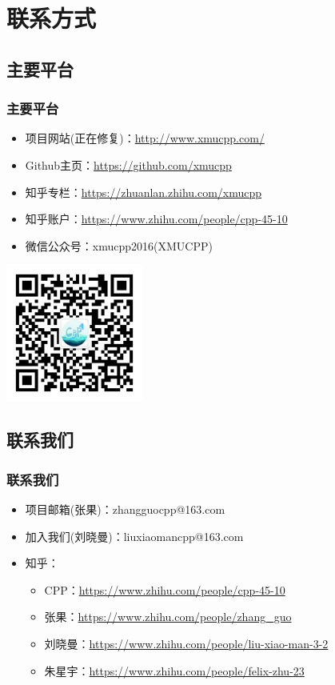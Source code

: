 \documentclass{beamer}
\begin{document}
\section{联系方式}
\subsection{主要平台}
\begin{frame}[allowframebreaks]
\frametitle{主要平台}
\begin{itemize}
  \item 项目网站(正在修复)：\url{http://www.xmucpp.com/}
  \item Github主页：\url{https://github.com/xmucpp}
  \item 知乎专栏：\url{https://zhuanlan.zhihu.com/xmucpp}
  \item 知乎账户：\url{https://www.zhihu.com/people/cpp-45-10}
  \framebreak
  \item 微信公众号：xmucpp2016(XMUCPP)
\end{itemize}
\begin{center}
\includegraphics[width=4.5cm,height=4.5cm]{wechat.jpg}
\end{center}
\end{frame}

\subsection{联系我们}
\begin{frame}
\frametitle{联系我们}
\begin{itemize}
  \item 项目邮箱(张果)：zhangguocpp@163.com
  \item 加入我们(刘晓曼)：liuxiaomancpp@163.com
  \item 知乎：
  \begin{itemize}
    \item CPP：\url{https://www.zhihu.com/people/cpp-45-10}
    \item 张果：\url{https://www.zhihu.com/people/zhang_guo}
    \item 刘晓曼：\url{https://www.zhihu.com/people/liu-xiao-man-3-2}
    \item 朱星宇：\url{https://www.zhihu.com/people/felix-zhu-23}
  \end{itemize}
\end{itemize}
\end{frame}
\end{document}
